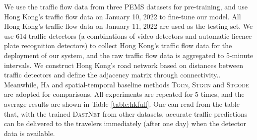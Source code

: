 \documentclass[sigconf]{acmart}
\theoremstyle{definition}
\begin{document}
We use the traffic flow data from three PEMS datasets for pre-training, and use Hong Kong's traffic flow data on January 10, 2022 to fine-tune our model. All Hong Kong's traffic flow data on January 11, 2022 are used as the testing set. We use 614 traffic detectors (a combinations of video detectors and automatic licence plate recognition detectors) to collect Hong Kong's traffic flow data for the deployment of our system, and the raw traffic flow data is aggregated to 5-minute intervals. We construct Hong Kong's road network  based on distances between traffic detectors and define the adjacency matrix through connectivity.. Meanwhile, \textsc{Ha} and spatial-temporal baseline methods \textsc{Tgcn}, \textsc{Stgcn} and \textsc{Stgode} are adopted for comparisons. 
All experiments are repeated for 5 times, and the average results are shown in Table \ref{table:hkfull}. One can read from the table that, with the trained \textsc{DastNet} from other datasets, accurate traffic predictions can be delivered to the travelers immediately (after one day) when the detector data is available.
\end{document}
